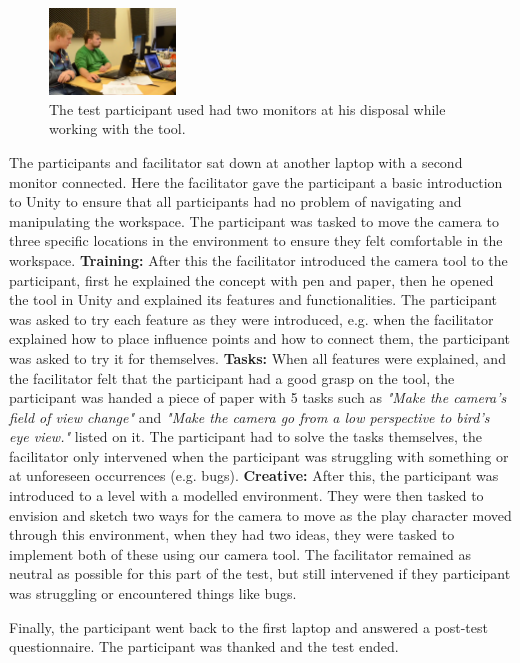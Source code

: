 \begin{figure}[htbp]
\centering
\includegraphics[width=0.3\textwidth]{Pics/test_setup}
\caption{The test participant used had two monitors at his disposal while working with the tool.}
\label{fig:framingConcept}
\end{figure}

The participants and facilitator sat down at another laptop with a second monitor connected. Here the facilitator gave the participant a basic introduction to Unity to ensure that all participants had no problem of navigating and manipulating the workspace. The participant was tasked to move the camera to three specific locations in the environment to ensure they felt comfortable in the workspace. \textbf{Training:} After this the facilitator introduced the camera tool to the participant, first he explained the concept with pen and paper, then he opened the tool in Unity and explained its features and functionalities. The participant was asked to try each feature as they were introduced, e.g. when the facilitator explained how to place influence points and how to connect them, the participant was asked to try it for themselves. \textbf{Tasks:} When all features were explained, and the facilitator felt that the participant had a good grasp on the tool, the participant was handed a piece of paper with 5 tasks such as \textit{"Make the camera's field of view change"} and \textit{"Make the camera go from a low perspective to bird's eye view."} listed on it. The participant had to solve the tasks themselves, the facilitator only intervened when the participant was struggling with something or at unforeseen occurrences (e.g. bugs). \textbf{Creative:} After this, the participant was introduced to a level with a modelled environment. They were then tasked to envision and sketch two ways for the camera to move as the play character moved through this environment, when they had two ideas, they were tasked to implement both of these using our camera tool. The facilitator remained as neutral as possible for this part of the test, but still intervened if they participant was struggling or encountered things like bugs.

Finally, the participant went back to the first laptop and answered a post-test questionnaire. The participant was thanked and the test ended.

